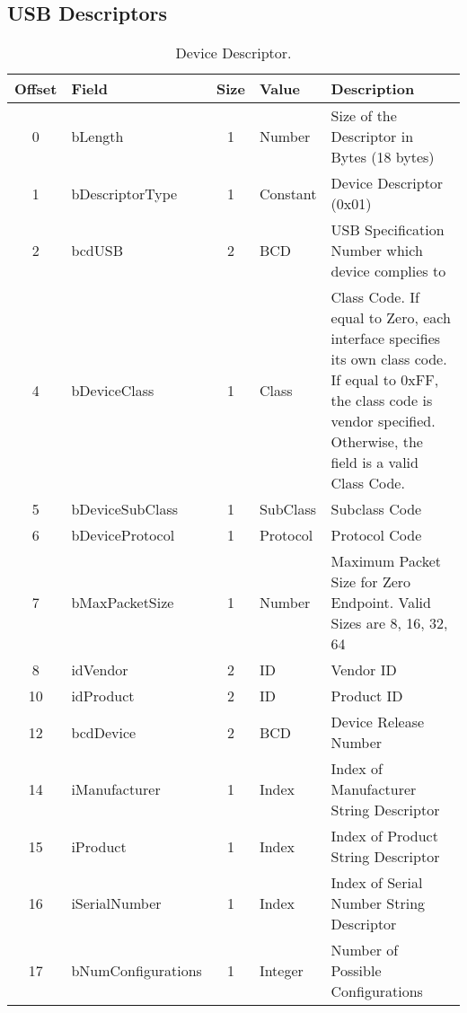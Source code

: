 \begin{appendices}

\section*{USB Descriptors}
\label{appendix:descriptors}

\begin{table}[h]
\centering
\label{tab:usb_descriptor}
\begin{tabular}{|c|l|c|l|p{8cm}|}
\hline
\textbf{Offset} & \textbf{Field} & \textbf{Size} & \textbf{Value} & \textbf{Description} \\ \hline
0 & bLength & 1 & Number & Size of the Descriptor in Bytes (18 bytes) \\ \hline
1 & bDescriptorType & 1 & Constant & Device Descriptor (0x01) \\ \hline
2 & bcdUSB & 2 & BCD & USB Specification Number which device complies to \\ \hline
4 & bDeviceClass & 1 & Class & Class Code. If equal to Zero, each interface specifies its own class code. If equal to 0xFF, the class code is vendor specified. Otherwise, the field is a valid Class Code. \\ \hline
5 & bDeviceSubClass & 1 & SubClass & Subclass Code \\ \hline
6 & bDeviceProtocol & 1 & Protocol & Protocol Code \\ \hline
7 & bMaxPacketSize & 1 & Number & Maximum Packet Size for Zero Endpoint. Valid Sizes are 8, 16, 32, 64 \\ \hline
8 & idVendor & 2 & ID & Vendor ID \\ \hline
10 & idProduct & 2 & ID & Product ID \\ \hline
12 & bcdDevice & 2 & BCD & Device Release Number \\ \hline
14 & iManufacturer & 1 & Index & Index of Manufacturer String Descriptor \\ \hline
15 & iProduct & 1 & Index & Index of Product String Descriptor \\ \hline
16 & iSerialNumber & 1 & Index & Index of Serial Number String Descriptor \\ \hline
17 & bNumConfigurations & 1 & Integer & Number of Possible Configurations \\ \hline
\end{tabular}
\caption{Device Descriptor.}
\end{table}


\end{appendices}

